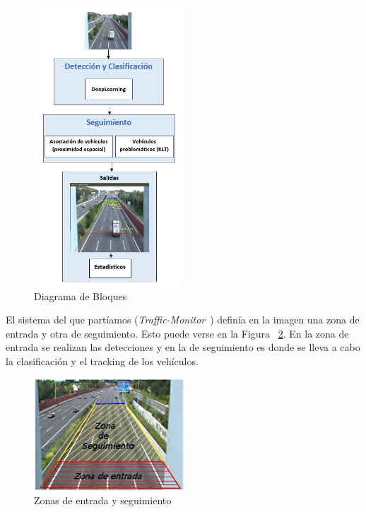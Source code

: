\begin{figure}
\begin{center}
	\includegraphics[width=0.5\textwidth]{figures/Diseno_global/diagrama_bloques.PNG}
   \caption{Diagrama de Bloques}
	\label{fig.diagrama_bloques}
\end{center}
\end{figure}

El sistema del que partíamos (\textit{Traffic-Monitor}~\cite{traffic_monitor_redo}) definía en la imagen una zona de entrada y otra de seguimiento. Esto puede verse en la Figura ~\ref{fig.zonas}. En la zona de entrada se realizan las detecciones y en la de seguimiento es donde se lleva a cabo la clasificación y el tracking de los vehículos.

\begin{figure}[H] 
\begin{center}
	\includegraphics[width=0.5\textwidth]{figures/Diseno_global/zonas.jpg}
   \caption{Zonas de entrada y seguimiento}
	\label{fig.zonas}
\end{center}
\end{figure}

